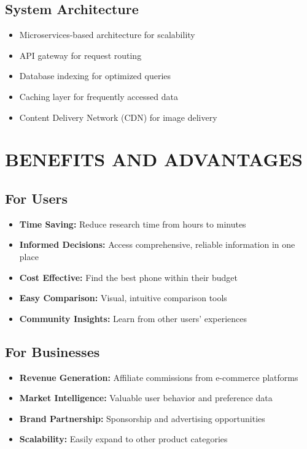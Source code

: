 \documentclass[12pt]{article}
\begin{document}
\subsection{System Architecture}
\begin{itemize}
    \item Microservices-based architecture for scalability
    \item API gateway for request routing
    \item Database indexing for optimized queries
    \item Caching layer for frequently accessed data
    \item Content Delivery Network (CDN) for image delivery
\end{itemize}

\section{BENEFITS AND ADVANTAGES}

\subsection{For Users}
\begin{itemize}
    \item \textbf{Time Saving:} Reduce research time from hours to minutes
    \item \textbf{Informed Decisions:} Access comprehensive, reliable information in one place
    \item \textbf{Cost Effective:} Find the best phone within their budget
    \item \textbf{Easy Comparison:} Visual, intuitive comparison tools
    \item \textbf{Community Insights:} Learn from other users' experiences
\end{itemize}

\subsection{For Businesses}
\begin{itemize}
    \item \textbf{Revenue Generation:} Affiliate commissions from e-commerce platforms
    \item \textbf{Market Intelligence:} Valuable user behavior and preference data
    \item \textbf{Brand Partnership:} Sponsorship and advertising opportunities
    \item \textbf{Scalability:} Easily expand to other product categories
\end{itemize}
\end{document}

